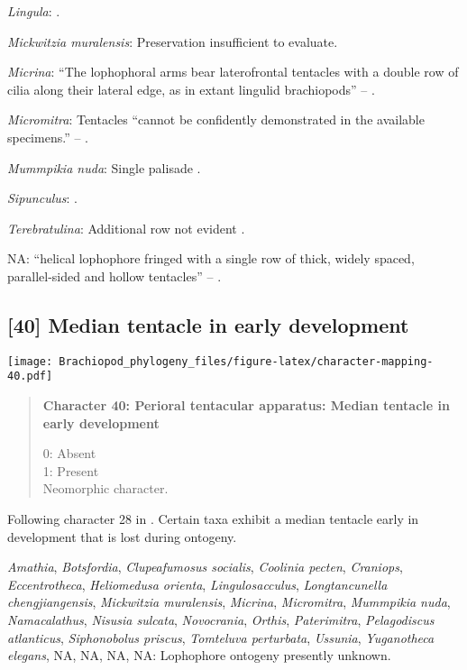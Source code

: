 \documentclass[openany]{book}
\theoremstyle{definition}
\theoremstyle{definition}
\theoremstyle{definition}
\theoremstyle{remark}
\begin{document}
\hypertarget{Lingula-coding-39}{}
\emph{Lingula}: \citet{Nielsen1966}.

\hypertarget{Mickwitzia_muralensis-coding-39}{}
\emph{Mickwitzia muralensis}: Preservation insufficient to evaluate.

\hypertarget{Micrina-coding-39}{}
\emph{Micrina}: ``The lophophoral arms bear laterofrontal tentacles with
a double row of cilia along their lateral edge, as in extant lingulid
brachiopods'' -- \citet{Zhang2009Architectureand}.

\hypertarget{Micromitra-coding-39}{}
\emph{Micromitra}: Tentacles ``cannot be confidently demonstrated in the
available specimens.'' --
\citet{Zhang2007Rhynchonelliformeanbrachiopods}.

\hypertarget{Mummpikia_nuda-coding-39}{}
\emph{Mummpikia nuda}: Single palisade \citep{Zhang2004Newdata}.

\hypertarget{Sipunculus-coding-39}{}
\emph{Sipunculus}: \citep{Temereva2016Thenervous}.

\hypertarget{Terebratulina-coding-39}{}
\emph{Terebratulina}: Additional row not evident \citep{Zhang2013}.

\hypertarget{NA-coding-39}{}
NA: ``helical lophophore fringed with a single row of thick, widely
spaced, parallel-sided and hollow tentacles'' --
\citet{Zhang2014Anearly}.

\subsection*{{[}40{]} Median tentacle in early
development}\label{median-tentacle-in-early-development}

\texttt{[image: Brachiopod\_phylogeny\_files/figure-latex/character-mapping-40.pdf]}

\begin{quote}
\textbf{Character 40: Perioral tentacular apparatus: Median tentacle in
early development}

0: Absent\\
1: Present\\
Neomorphic character.
\end{quote}

Following character 28 in \citet{Carlson1995Phylogeneticrelationships}.
Certain taxa exhibit a median tentacle early in development that is lost
during ontogeny.

\hypertarget{Amathia-coding-40}{}
\emph{Amathia}, \emph{Botsfordia}, \emph{Clupeafumosus socialis},
\emph{Coolinia pecten}, \emph{Craniops}, \emph{Eccentrotheca},
\emph{Heliomedusa orienta}, \emph{Lingulosacculus}, \emph{Longtancunella
chengjiangensis}, \emph{Mickwitzia muralensis}, \emph{Micrina},
\emph{Micromitra}, \emph{Mummpikia nuda}, \emph{Namacalathus},
\emph{Nisusia sulcata}, \emph{Novocrania}, \emph{Orthis},
\emph{Paterimitra}, \emph{Pelagodiscus atlanticus}, \emph{Siphonobolus
priscus}, \emph{Tomteluva perturbata}, \emph{Ussunia}, \emph{Yuganotheca
elegans}, NA, NA, NA, NA: Lophophore ontogeny presently unknown.
\end{document}
